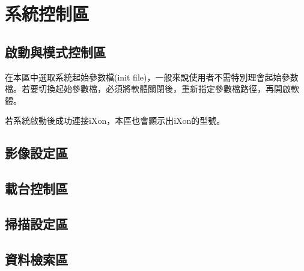 \documentclass[12pt]{article}
\begin{document}
    \section{系統控制區}
    \subsection{啟動與模式控制區}
    在本區中選取系統起始參數檔(init file)，一般來說使用者不需特別理會起始參數檔。若要切換起始參數檔，必須將軟體關閉後，重新指定參數檔路徑，再開啟軟體。

    若系統啟動後成功連接iXon，本區也會顯示出iXon的型號。
    \subsection{影像設定區}
    \subsection{載台控制區}
    \subsection{掃描設定區}
    \subsection{資料檢索區}
\end{document}
